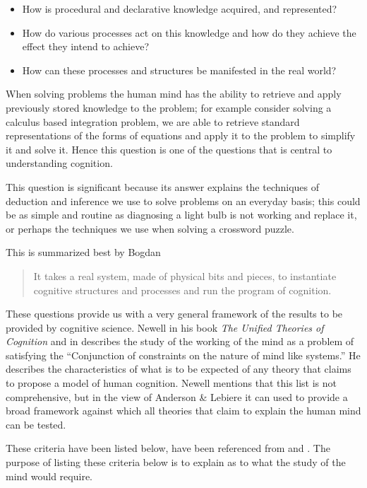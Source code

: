\begin{itemize}
\item How is procedural and declarative knowledge acquired, and
represented?
\item How do various processes act on this knowledge and how do they
achieve the effect they intend to achieve?
\item How can these processes and structures be manifested in the real
world?
\end{itemize}



 When solving problems the human mind has the ability to
retrieve and apply previously stored knowledge to the problem; for
example consider solving a calculus based integration problem, we are
able to retrieve standard representations of the forms of equations
and apply it to the problem to simplify it and solve it. Hence this
question is one of the questions that is central to understanding
cognition.

This question is significant because its answer explains the
techniques of deduction and inference we use to solve problems on an
everyday basis; this could be as simple and routine as diagnosing a
light bulb is not working and replace it, or perhaps the techniques we
use when solving a crossword puzzle. 

This is summarized best by Bogdan \cite{Bogdan:1993aa}

\begin{quote}
It takes a real system, made of physical bits and pieces, to 
instantiate cognitive structures and processes and run the program of 
cognition.
\end{quote}

These questions provide us with a very general framework of the
results to be provided by cognitive science. Newell in his book
\emph{The Unified Theories of Cognition} and in
\cite{Newell1980135} describes the study of the working of the mind as
a problem of satisfying the ``Conjunction of constraints on the nature
of mind like systems.'' He describes the characteristics of what is to
be expected of any theory that claims to propose a model of human
cognition. Newell mentions that this list is not comprehensive, but in
the view of Anderson \& Lebiere it can used to provide a broad
framework against which all theories that claim to explain the human
mind can be tested.
 

These criteria have been listed below, have been referenced from
\cite{CambridgeJournals:207162} and \cite{Newell:1990aa}. The purpose
of listing these criteria below is to explain as to what the study of
the mind would require.

